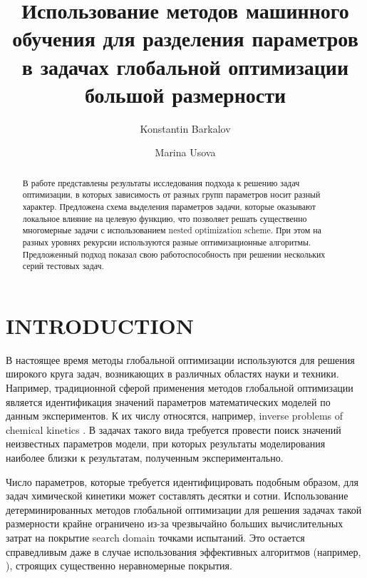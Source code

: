 \documentclass{aip-cp}
\begin{document}
\title{Использование методов машинного обучения для разделения параметров в задачах глобальной оптимизации большой размерности}

\author[aff1]{Konstantin Barkalov}
\author[aff1]{Marina Usova}


\maketitle

\begin{abstract}
В работе представлены результаты исследования подхода к решению задач оптимизации, в которых зависимость от разных групп параметров носит разный характер.
Предложена схема выделения параметров задачи, которые оказывают локальное влияние на целевую функцию, что позволяет решать существенно многомерные задачи с использованием nested optimization scheme. При этом на разных уровнях рекурсии используются разные оптимизационные алгоритмы. Предложенный подход показал свою работоспособность при решении нескольких серий тестовых задач.

\end{abstract}

\section{INTRODUCTION}

В настоящее время методы глобальной оптимизации используются для решения широкого круга задач, возникающих в различных областях науки и техники. 
Например, традиционной сферой применения методов глобальной оптимизации является идентификация значений параметров математических моделей по данным экспериментов. К их числу относятся, например, inverse problems of chemical kinetics \cite{Gubaydullin2021}.  В задачах такого вида требуется провести поиск значений неизвестных параметров модели, при которых результаты моделирования наиболее близки к результатам, полученным экспериментально.

Число параметров, которые требуется идентифицировать подобным образом, для задач химической кинетики может составлять десятки и сотни. Использование детерминированных методов глобальной оптимизации для решения задачах такой размерности крайне ограничено из-за чрезвычайно больших вычислительных затрат на покрытие search domain точками испытаний. Это остается справедливым даже в случае использования эффективных алгоритмов (например, \cite{Paulavicius2011,Evtushenko2009,Jones2009}), строящих существенно неравномерные покрытия. 
\end{document}
